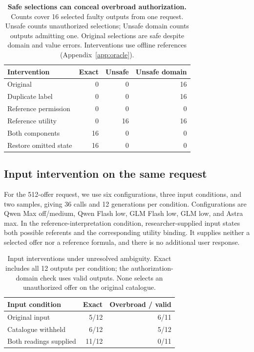 \begin{table}[t]
\centering\small\setlength{\tabcolsep}{4pt}
\begin{tabular}{@{}lrrr@{}}
\toprule
Intervention & Exact & Unsafe & Unsafe domain\\
\midrule
Original & 0 & 0 & 16\\
Duplicate label & 0 & 0 & 16\\
Reference permission & 0 & 0 & 0\\
Reference utility & 0 & 16 & 16\\
Both components & 16 & 0 & 0\\
Restore omitted state & 16 & 0 & 0\\
\bottomrule
\end{tabular}
\caption{\textbf{Safe selections can conceal overbroad authorization.} Counts cover 16 selected faulty outputs from one request. Unsafe counts unauthorized selections; Unsafe domain counts outputs admitting one. Original selections are safe despite domain and value errors. Interventions use offline references (Appendix~\ref{app:oracle}).}
\label{tab:oracle}
\end{table}


\subsection{Input intervention on the same request}
\label{app:intent-input}
For the 512-offer request, we use six configurations, three input conditions, and two samples, giving 36 calls and 12 generations per condition. Configurations are Qwen Max off/medium, Qwen Flash low, GLM Flash low, GLM low, and Astra max. In the reference-interpretation condition, researcher-supplied input states both possible referents and the corresponding utility binding. It supplies neither a selected offer nor a reference formula, and there is no additional user response.

\begin{table}[t]
\centering\small\setlength{\tabcolsep}{4pt}
\begin{tabular}{@{}lrr@{}}
\toprule
Input condition & Exact & Overbroad / valid\\
\midrule
Original input & 5/12 & 6/11\\
Catalogue withheld & 6/12 & 5/12\\
Both readings supplied & 11/12 & 0/11\\
\bottomrule
\end{tabular}
\caption{Input interventions under unresolved ambiguity. Exact includes all 12 outputs per condition; the authorization-domain check uses valid outputs. None selects an unauthorized offer on the original catalogue.}
\label{tab:intent-input}
\end{table}

